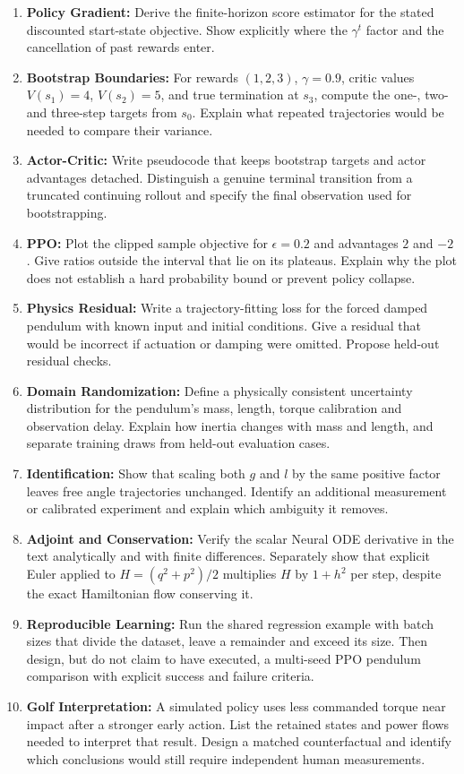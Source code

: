 \begin{enumerate}
\item \textbf{Policy Gradient:} Derive the finite-horizon score estimator for the stated discounted start-state objective. Show explicitly where the $\gamma^t$ factor and the cancellation of past rewards enter.
\item \textbf{Bootstrap Boundaries:} For rewards $(1,2,3)$, $\gamma=0.9$, critic values $V(s_1)=4$, $V(s_2)=5$, and true termination at $s_3$, compute the one-, two- and three-step targets from $s_0$. Explain what repeated trajectories would be needed to compare their variance.
\item \textbf{Actor-Critic:} Write pseudocode that keeps bootstrap targets and actor advantages detached. Distinguish a genuine terminal transition from a truncated continuing rollout and specify the final observation used for bootstrapping.
\item \textbf{PPO:} Plot the clipped sample objective for $\epsilon=0.2$ and advantages $2$ and $-2$. Give ratios outside the interval that lie on its plateaus. Explain why the plot does not establish a hard probability bound or prevent policy collapse.
\item \textbf{Physics Residual:} Write a trajectory-fitting loss for the forced damped pendulum with known input and initial conditions. Give a residual that would be incorrect if actuation or damping were omitted. Propose held-out residual checks.
\item \textbf{Domain Randomization:} Define a physically consistent uncertainty distribution for the pendulum's mass, length, torque calibration and observation delay. Explain how inertia changes with mass and length, and separate training draws from held-out evaluation cases.
\item \textbf{Identification:} Show that scaling both $g$ and $l$ by the same positive factor leaves free angle trajectories unchanged. Identify an additional measurement or calibrated experiment and explain which ambiguity it removes.
\item \textbf{Adjoint and Conservation:} Verify the scalar Neural ODE derivative in the text analytically and with finite differences. Separately show that explicit Euler applied to $H=(q^2+p^2)/2$ multiplies $H$ by $1+h^2$ per step, despite the exact Hamiltonian flow conserving it.
\item \textbf{Reproducible Learning:} Run the shared regression example with batch sizes that divide the dataset, leave a remainder and exceed its size. Then design, but do not claim to have executed, a multi-seed PPO pendulum comparison with explicit success and failure criteria.
\item \textbf{Golf Interpretation:} A simulated policy uses less commanded torque near impact after a stronger early action. List the retained states and power flows needed to interpret that result. Design a matched counterfactual and identify which conclusions would still require independent human measurements.
\end{enumerate}
